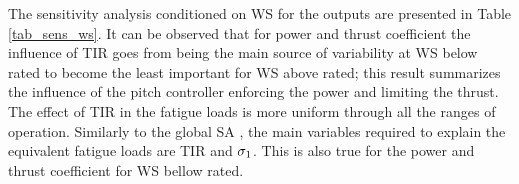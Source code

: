 \documentclass[preprint,12pt]{elsarticle}
\begin{document}
The sensitivity analysis conditioned on WS for the outputs are presented in Table \ref{tab_sens_ws}. It can be observed that for power and thrust coefficient the influence of TIR goes from being the main source of variability at WS below rated to become the least important for WS above rated; this result summarizes the influence of the pitch controller enforcing the power and limiting the thrust. The effect of TIR in the fatigue loads is more uniform through all the ranges of operation. Similarly to the global SA , the main variables required to explain the equivalent fatigue loads are TIR and $\sigma_{1}$. This is also true for the power and thrust coefficient for WS bellow rated.

\begin{table}[!h]
\begin{centering}
\end{centering}
\end{table}
\end{document}
